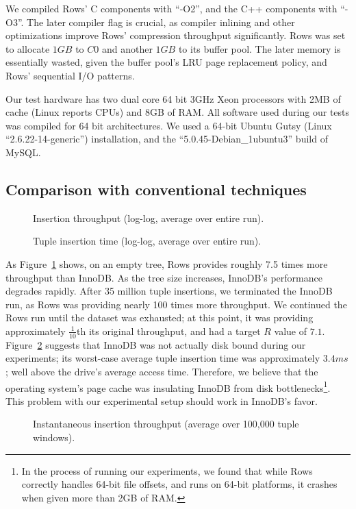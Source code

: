 \documentclass{sig-alternate-sigmod08}
\newcommand{\rows}{Rows\xspace}
\newcommand{\rowss}{Rows'\xspace}
\begin{document}
We compiled \rowss C components with ``-O2'', and the C++ components
with ``-O3''.  The later compiler flag is crucial, as compiler
inlining and other optimizations improve \rowss compression throughput
significantly.  \rows was set to allocate $1GB$ to $C0$ and another
$1GB$ to its buffer pool.  The later memory is essentially wasted,
given the buffer pool's LRU page replacement policy, and \rowss
sequential I/O patterns.

Our test hardware has two dual core 64 bit 3GHz Xeon processors with
2MB of cache (Linux reports CPUs) and 8GB of RAM.  All software used during our tests
was compiled for 64 bit architectures.  We used a 64-bit Ubuntu Gutsy
(Linux ``2.6.22-14-generic'') installation, and the
``5.0.45-Debian\_1ubuntu3'' build of MySQL.

\subsection{Comparison with conventional techniques}

\begin{figure}
\centering {}
\caption{Insertion throughput (log-log, average over entire run).}
\label{fig:avg-thru}
\end{figure}
\begin{figure}
\centering
{}
\caption{Tuple insertion time (log-log, average over entire run).}
\label{fig:avg-tup}
\end{figure}

As Figure~\ref{fig:avg-thru} shows, on an empty tree, \rows provides
roughly 7.5 times more throughput than InnoDB.  As the tree size
increases, InnoDB's performance degrades rapidly.  After 35 million
tuple insertions, we terminated the InnoDB run, as \rows was providing
nearly 100 times more throughput.  We continued the \rows run until
the dataset was exhausted; at this point, it was providing
approximately $\frac{1}{10}$th its original throughput, and had a
target $R$ value of $7.1$.  Figure~\ref{fig:avg-tup} suggests that
InnoDB was not actually disk bound during our experiments; its
worst-case average tuple insertion time was approximately $3.4 ms$;
well above the drive's average access time.  Therefore, we believe
that the operating system's page cache was insulating InnoDB from disk
bottlenecks\footnote{In the process of running our experiments, we
  found that while \rows correctly handles 64-bit file offsets, and
  runs on 64-bit platforms, it crashes when given more than 2GB of
  RAM.}.  This problem with our experimental setup should work in InnoDB's favor.
\begin{figure}
\centering
{}
\caption{Instantaneous insertion throughput (average over 100,000 tuple windows).}
\label{fig:inst-thru}
\end{figure}
\end{document}
